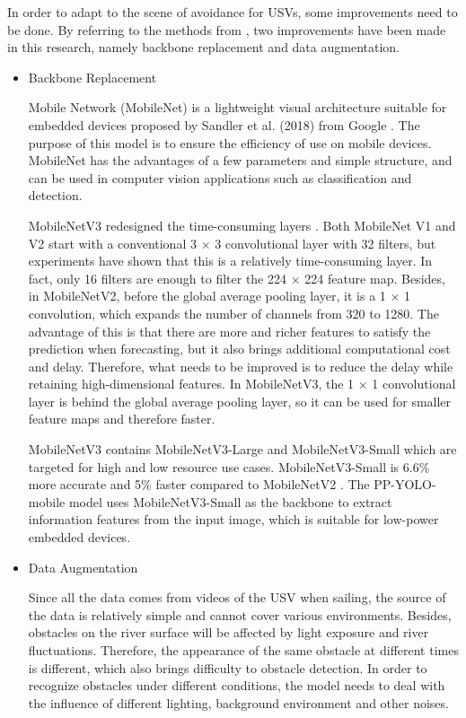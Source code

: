 \documentclass[sensors,article,submit,moreauthors,pdftex]{Definitions/mdpi}
\begin{document}
\begin{paracol}{2}
In order to adapt to the scene of avoidance for USVs, 
some improvements need to be done. By referring to the methods from \cite{zoph2019learning, mahto2020refining, mandal2020object}, two improvements have been made in this research, namely backbone replacement and data augmentation.

\begin{itemize}
\item{Backbone Replacement}

Mobile Network (MobileNet) is a lightweight visual architecture suitable for embedded devices proposed by Sandler et al. (2018) from Google \cite{sandler2018mobilenetv2}. The purpose of this model is to ensure the efficiency of use on mobile devices. MobileNet has the advantages of a few parameters and simple structure, and can be used in computer vision applications such as classification and detection.


MobileNetV3 redesigned the time-consuming layers \cite{howard2019searching}. Both MobileNet V1 and V2 start with a conventional 3 $\times$ 3 convolutional layer with 32 filters, but experiments have shown that this is a relatively time-consuming layer. In fact, only 16 filters are enough to filter the 224 $\times$ 224 feature map. Besides, in MobileNetV2, before the global average pooling layer, it is a 1 $\times$ 1 convolution, which expands the number of channels from 320 to 1280. The advantage of this is that there are more and richer features to satisfy the prediction when forecasting, but it also brings additional computational cost and delay. Therefore, what needs to be improved is to reduce the delay while retaining high-dimensional features. In MobileNetV3, the 1 $\times$ 1 convolutional layer is behind the global average pooling layer, so it can be used for smaller feature maps and therefore faster.

MobileNetV3 contains MobileNetV3-Large and MobileNetV3-Small which are targeted for high and low resource use cases. MobileNetV3-Small is 6.6\% more accurate and 5\% faster compared to MobileNetV2 \cite{howard2019searching}. The PP-YOLO-mobile model uses MobileNetV3-Small as the backbone to extract information features from the input image, which is suitable for low-power embedded devices.

\end{itemize}

\begin{itemize}
\item{Data Augmentation}


Since all the data comes from videos of the USV when sailing, the source of the data is relatively simple and cannot cover various environments. Besides, obstacles on the river surface will be affected by light exposure and river fluctuations. Therefore, the appearance of the same obstacle at different times is different, which also brings difficulty to obstacle detection. In order to recognize obstacles under different conditions, the model needs to deal with the influence of different lighting, background environment and other noises. 


\end{itemize}
\end{paracol}
\end{document}
